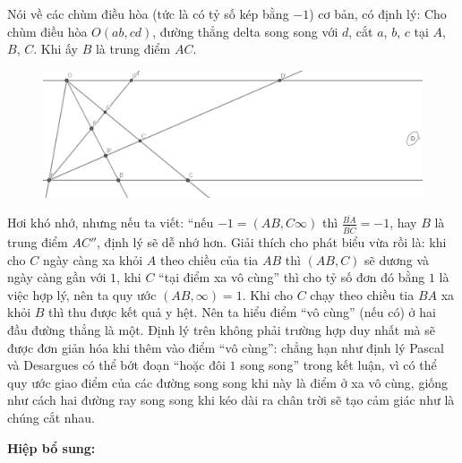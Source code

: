 		\vskip 0.1cm
Nói về các chùm điều hòa (tức là có tỷ số kép bằng $-1$) cơ bản, có định lý:
	\vskip 0.1cm
	Cho chùm điều hòa $O(ab, cd)$, đường thẳng delta song song với $d$, cắt $a$, $b$, $c$ tại $A$, $B$, $C$. Khi ấy $B$ là trung điểm $AC$. 
\begin{figure}[ht]
\includegraphics[width=\textwidth]{harmony_at_infinity.png}
\end{figure}
	Hơi khó nhớ, nhưng nếu ta viết: ``nếu $-1 = (AB, C \infty )$ thì $\frac{ \overline{BA}}{ \overline{BC}} = -1$, hay $B$ là trung điểm $AC''$, định lý sẽ dễ nhớ hơn.
	\vskip 0.1cm
	Giải thích cho phát biểu vừa rồi là: khi cho $C$ ngày càng xa khỏi $A$ theo chiều của tia $AB$ thì $(AB, C)$ sẽ dương và ngày càng gần với $1$, khi $C$ ``tại điểm xa vô cùng'' thì cho tỷ số đơn đó bằng $1$ là việc hợp lý, nên ta quy ước $(AB, \infty) = 1$. Khi cho $C$ chạy theo chiều tia $BA$ xa khỏi $B$ thì thu được kết quả y hệt. Nên ta hiểu điểm ``vô cùng'' (nếu có) ở hai đầu đường thẳng là một. Định lý trên không phải trường hợp duy nhất mà sẽ được đơn giản hóa khi thêm vào điểm ``vô cùng'': chẳng hạn như định lý Pascal và Desargues có thể bớt đoạn ``hoặc đôi $1$ song song'' trong kết luận, vì có thể quy ước giao điểm của các đường song song khi này là điểm ở xa vô cùng, giống như cách hai đường ray song song khi kéo dài ra chân trời sẽ tạo cảm giác như là chúng cắt nhau.
	\vskip 0.1cm
	
\textbf{Hiệp bổ sung:}

